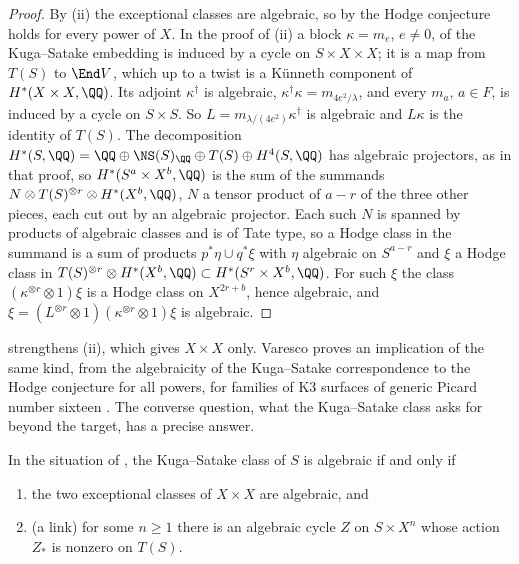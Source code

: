 \begin{proof}
By (ii) the exceptional classes are algebraic, so by
 the Hodge conjecture holds for every power of $X$.
In the proof of (ii) a block $\kappa=m_{e}$, $e\ne0$, of
the Kuga--Satake embedding is induced by a cycle on $S\times X\times X$; it
is a map from $T(S)$ to $\End V$, which up to a twist is a K\"unneth
component of $H^{*}(X\times X,\QQ)$. Its adjoint $\kappa^{\dagger}$ is
algebraic, $\kappa^{\dagger}\kappa=m_{4e^{2}/\lambda}$, and every $m_{a}$,
$a\in F$, is induced by a cycle on $S\times S$. So
$L=m_{\lambda/(4e^{2})}\kappa^{\dagger}$ is algebraic and $L\kappa$ is the
identity of $T(S)$. The decomposition
$H^{*}(S,\QQ)=\QQ\oplus\NS(S)_{\QQ}\oplus T(S)\oplus H^{4}(S,\QQ)$ has
algebraic projectors, as in that proof, so $H^{*}(S^{a}\times X^{b},\QQ)$ is
the sum of the summands $N\otimes T(S)^{\otimes r}\otimes H^{*}(X^{b},\QQ)$,
$N$ a tensor product of $a-r$ of the three other pieces, each cut out by an
algebraic projector. Each such $N$ is spanned by products of algebraic classes
and is of Tate type, so a Hodge class in the summand is a sum of products
$p^{*}\eta\cup q^{*}\xi$ with $\eta$ algebraic on $S^{a-r}$ and $\xi$ a Hodge
class in $T(S)^{\otimes r}\otimes H^{*}(X^{b},\QQ)\subset H^{*}(S^{r}\times
X^{b},\QQ)$. For such $\xi$ the class $(\kappa^{\otimes r}\otimes1)\xi$ is a
Hodge class on $X^{2r+b}$, hence algebraic, and
$\xi=(L^{\otimes r}\otimes1)(\kappa^{\otimes r}\otimes1)\xi$ is algebraic.
\end{proof}

 strengthens (ii), which gives
$X\times X$ only. Varesco proves an implication of the same kind, from the
algebraicity of the Kuga--Satake correspondence to the Hodge conjecture for
all powers, for families of K3 surfaces of generic Picard number sixteen
\cite{Var22}. The converse question, what the Kuga--Satake class asks for
beyond the target, has a precise answer.

\begin{proposition}\label{prop:mumfordkslink}
In the situation of , the Kuga--Satake class of
$S$ is algebraic if and only if
\begin{enumerate}[label=\textup{(\roman*)},nosep,leftmargin=2.6em]
\item the two exceptional classes of $X\times X$ are algebraic, and
\item \textup{(}a link\textup{)} for some $n\ge1$ there is an algebraic cycle
  $Z$ on $S\times X^{n}$ whose action $Z_{*}$ is nonzero on $T(S)$.
\end{enumerate}
\end{proposition}

